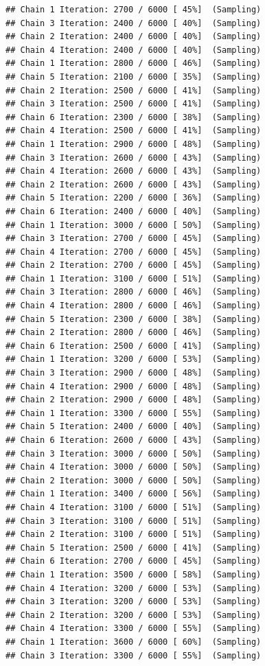\documentclass[
]{article}
\begin{document}
\begin{verbatim}
## Chain 1 Iteration: 2700 / 6000 [ 45%]  (Sampling) 
## Chain 3 Iteration: 2400 / 6000 [ 40%]  (Sampling) 
## Chain 2 Iteration: 2400 / 6000 [ 40%]  (Sampling) 
## Chain 4 Iteration: 2400 / 6000 [ 40%]  (Sampling) 
## Chain 1 Iteration: 2800 / 6000 [ 46%]  (Sampling) 
## Chain 5 Iteration: 2100 / 6000 [ 35%]  (Sampling) 
## Chain 2 Iteration: 2500 / 6000 [ 41%]  (Sampling) 
## Chain 3 Iteration: 2500 / 6000 [ 41%]  (Sampling) 
## Chain 6 Iteration: 2300 / 6000 [ 38%]  (Sampling) 
## Chain 4 Iteration: 2500 / 6000 [ 41%]  (Sampling) 
## Chain 1 Iteration: 2900 / 6000 [ 48%]  (Sampling) 
## Chain 3 Iteration: 2600 / 6000 [ 43%]  (Sampling) 
## Chain 4 Iteration: 2600 / 6000 [ 43%]  (Sampling) 
## Chain 2 Iteration: 2600 / 6000 [ 43%]  (Sampling) 
## Chain 5 Iteration: 2200 / 6000 [ 36%]  (Sampling) 
## Chain 6 Iteration: 2400 / 6000 [ 40%]  (Sampling) 
## Chain 1 Iteration: 3000 / 6000 [ 50%]  (Sampling) 
## Chain 3 Iteration: 2700 / 6000 [ 45%]  (Sampling) 
## Chain 4 Iteration: 2700 / 6000 [ 45%]  (Sampling) 
## Chain 2 Iteration: 2700 / 6000 [ 45%]  (Sampling) 
## Chain 1 Iteration: 3100 / 6000 [ 51%]  (Sampling) 
## Chain 3 Iteration: 2800 / 6000 [ 46%]  (Sampling) 
## Chain 4 Iteration: 2800 / 6000 [ 46%]  (Sampling) 
## Chain 5 Iteration: 2300 / 6000 [ 38%]  (Sampling) 
## Chain 2 Iteration: 2800 / 6000 [ 46%]  (Sampling) 
## Chain 6 Iteration: 2500 / 6000 [ 41%]  (Sampling) 
## Chain 1 Iteration: 3200 / 6000 [ 53%]  (Sampling) 
## Chain 3 Iteration: 2900 / 6000 [ 48%]  (Sampling) 
## Chain 4 Iteration: 2900 / 6000 [ 48%]  (Sampling) 
## Chain 2 Iteration: 2900 / 6000 [ 48%]  (Sampling) 
## Chain 1 Iteration: 3300 / 6000 [ 55%]  (Sampling) 
## Chain 5 Iteration: 2400 / 6000 [ 40%]  (Sampling) 
## Chain 6 Iteration: 2600 / 6000 [ 43%]  (Sampling) 
## Chain 3 Iteration: 3000 / 6000 [ 50%]  (Sampling) 
## Chain 4 Iteration: 3000 / 6000 [ 50%]  (Sampling) 
## Chain 2 Iteration: 3000 / 6000 [ 50%]  (Sampling) 
## Chain 1 Iteration: 3400 / 6000 [ 56%]  (Sampling) 
## Chain 4 Iteration: 3100 / 6000 [ 51%]  (Sampling) 
## Chain 3 Iteration: 3100 / 6000 [ 51%]  (Sampling) 
## Chain 2 Iteration: 3100 / 6000 [ 51%]  (Sampling) 
## Chain 5 Iteration: 2500 / 6000 [ 41%]  (Sampling) 
## Chain 6 Iteration: 2700 / 6000 [ 45%]  (Sampling) 
## Chain 1 Iteration: 3500 / 6000 [ 58%]  (Sampling) 
## Chain 4 Iteration: 3200 / 6000 [ 53%]  (Sampling) 
## Chain 3 Iteration: 3200 / 6000 [ 53%]  (Sampling) 
## Chain 2 Iteration: 3200 / 6000 [ 53%]  (Sampling) 
## Chain 4 Iteration: 3300 / 6000 [ 55%]  (Sampling) 
## Chain 1 Iteration: 3600 / 6000 [ 60%]  (Sampling) 
## Chain 3 Iteration: 3300 / 6000 [ 55%]  (Sampling) 

\end{verbatim}
\end{document}
